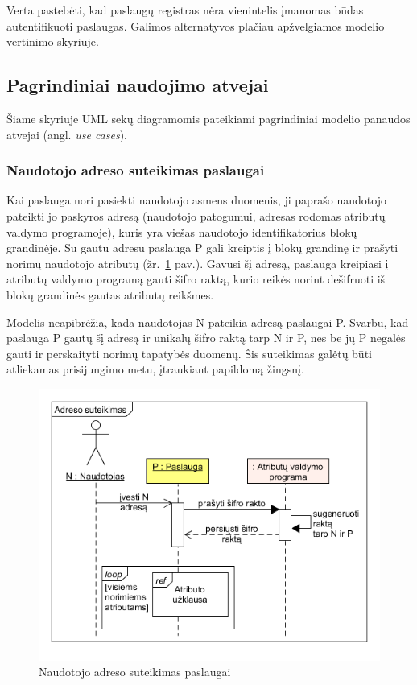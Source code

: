 Verta pastebėti, kad paslaugų registras nėra vienintelis įmanomas būdas autentifikuoti paslaugas. Galimos alternatyvos plačiau apžvelgiamos
modelio vertinimo \hypertarget{section:blockchainIDMevaluation}{skyriuje}.

\subsection{Pagrindiniai naudojimo atvejai}

Šiame skyriuje UML sekų diagramomis pateikiami pagrindiniai modelio panaudos atvejai (angl. \textit{use cases}).

\subsubsection{Naudotojo adreso suteikimas paslaugai}

Kai paslauga nori pasiekti naudotojo asmens duomenis, ji paprašo naudotojo pateikti jo paskyros adresą (naudotojo patogumui, adresas rodomas
atributų valdymo programoje),
kuris yra viešas naudotojo identifikatorius blokų grandinėje.
Su gautu adresu paslauga P gali kreiptis į blokų grandinę ir 
prašyti norimų naudotojo atributų (žr.\hypertarget{fig:userGivesAddress}{~\ref{fig:userGivesAddress} pav.}).
Gavusi šį adresą, paslauga kreipiasi į atributų valdymo programą gauti šifro raktą, kurio reikės norint
dešifruoti iš blokų grandinės gautas atributų reikšmes.

Modelis neapibrėžia, kada naudotojas N pateikia adresą paslaugai P. Svarbu, kad paslauga P gautų šį adresą ir unikalų šifro raktą tarp N ir P,
nes be jų P negalės gauti ir perskaityti norimų tapatybės duomenų. Šis suteikimas galėtų būti atliekamas prisijungimo metu, įtraukiant
papildomą žingsnį.

\begin{figure}[H]
    \centering
    \includegraphics[scale=0.6]{img/userGivesAddress}
    \caption{Naudotojo adreso suteikimas paslaugai}
    \label{fig:userGivesAddress}
\end{figure}

